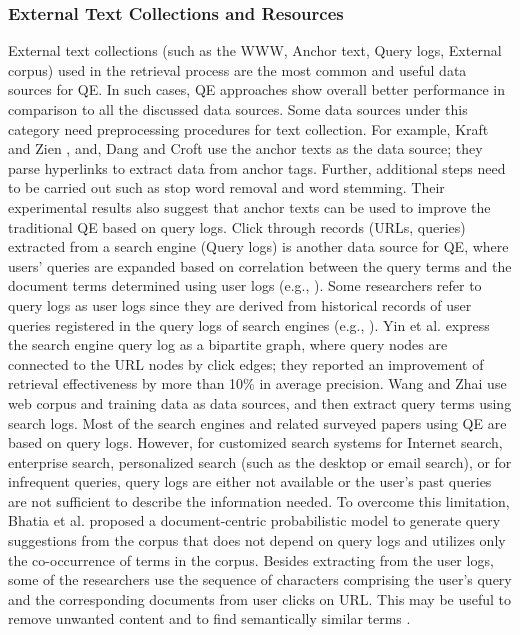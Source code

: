 \subsubsection{External Text Collections and Resources}
External text collections (such as the WWW, Anchor text, Query logs, External corpus) used in the retrieval process  are the most common and useful data sources for QE. In such cases, QE approaches show overall better performance in comparison to all the discussed data sources. Some data sources under this category need preprocessing procedures for text collection. For example, Kraft and Zien \cite{kraft2004mining}, and, Dang and Croft \cite{dang2010query} use the anchor texts as the data source; they parse hyperlinks to extract data from anchor tags. Further, additional steps need to be carried out such as stop word removal and word stemming. Their experimental results  also suggest that anchor texts can  be used to improve the traditional QE based on query logs. Click through records (URLs, queries) extracted from a search engine (Query logs) is another data source for QE, where users' queries are expanded based on correlation between the query terms and the document terms determined using user logs (e.g., \cite{wen2002query,cui2003query}). Some researchers refer to query logs as user logs since they are derived from  historical records of user queries registered in the query logs of search engines (e.g., \cite{cui2002probabilistic,billerbeck2003query,baeza2004query,yin2009query}). Yin et al. \cite{yin2009query} express the search engine query log as a bipartite graph, where query nodes are connected to the URL nodes by click edges; they reported an improvement of retrieval effectiveness by more than 10\% in average precision. Wang and Zhai \cite{wang2008mining} use web corpus and training data as data sources, and then extract query terms using search logs. Most of the search engines and related surveyed papers using QE are based on query logs. However, for customized search systems for Internet search, enterprise search, personalized search (such as the desktop or email search), or for infrequent queries, query logs are either not available or the user's past queries are not sufficient to describe the information needed. To overcome this limitation, Bhatia et al. \cite{bhatia2011query} proposed a document-centric probabilistic model to generate query suggestions from the corpus that does not depend on query logs and utilizes only the co-occurrence of terms in the corpus. Besides extracting from the user logs, some of the researchers use the sequence of characters comprising the user's query and the corresponding documents from user clicks on URL. This may be useful to remove unwanted content and to find semantically similar terms \cite{beeferman2000agglomerative}.

